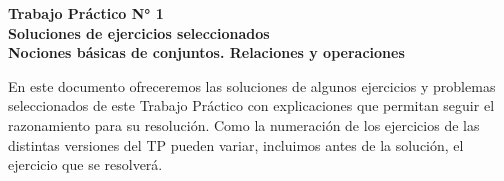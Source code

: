 \documentclass[12pt]{article}
\theoremstyle{definition}
\begin{document}
\fancyhf{}
\pagestyle{fancy}


\begin{centering}
\Large{\textbf{Trabajo Práctico N° 1}}\\
\large{\textbf{Soluciones de ejercicios seleccionados}}\\

\small{\textbf{Nociones básicas de conjuntos. Relaciones y operaciones}}\\
\end{centering}
\vspace{1cm}
\noindent
En este documento ofreceremos las soluciones de algunos ejercicios y problemas seleccionados de este Trabajo Práctico con explicaciones que permitan seguir el razonamiento para su resolución. Como la numeración de los ejercicios de las distintas versiones del TP pueden variar, incluimos antes de la solución, el ejercicio que se resolverá.
\end{document}
